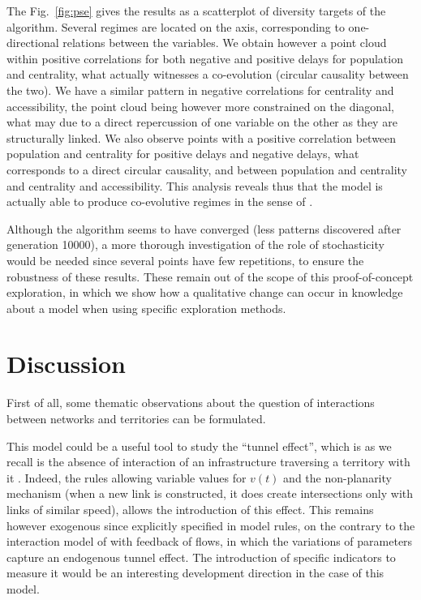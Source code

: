 \documentclass[graybox]{svmult}
\begin{document}
The Fig.~\ref{fig:pse} gives the results as a scatterplot of diversity targets of the algorithm. Several regimes are located on the axis, corresponding to one-directional relations between the variables. We obtain however a point cloud within positive correlations for both negative and positive delays for population and centrality, what actually witnesses a co-evolution (circular causality between the two). We have a similar pattern in negative correlations for centrality and accessibility, the point cloud being however more constrained on the diagonal, what may due to a direct repercussion of one variable on the other as they are structurally linked. We also observe points with a positive correlation between population and centrality for positive delays and negative delays, what corresponds to a direct circular causality, and between population and centrality and centrality and accessibility. This analysis reveals thus that the model is actually able to produce co-evolutive regimes in the sense of \cite{raimbault:tel-01857741}.


Although the algorithm seems to have converged (less patterns discovered after generation 10000), a more thorough investigation of the role of stochasticity would be needed since several points have few repetitions, to ensure the robustness of these results. These remain out of the scope of this proof-of-concept exploration, in which we show how a qualitative change can occur in knowledge about a model when using specific exploration methods.




\section{Discussion}


First of all, some thematic observations about the question of interactions between networks and territories can be formulated.


This model could be a useful tool to study the ``tunnel effect'', which is as we recall is the absence of interaction of an infrastructure traversing a territory with it \cite{raimbault2018indirect}. Indeed, the rules allowing variable values for $v(t)$ and the non-planarity mechanism (when a new link is constructed, it does create intersections only with links of similar speed), allows the introduction of this effect. This remains however exogenous since explicitly specified in model rules, on the contrary to the interaction model of \cite{raimbault2018indirect} with feedback of flows, in which the variations of parameters capture an endogenous tunnel effect. The introduction of specific indicators to measure it would be an interesting development direction in the case of this model.
\end{document}
